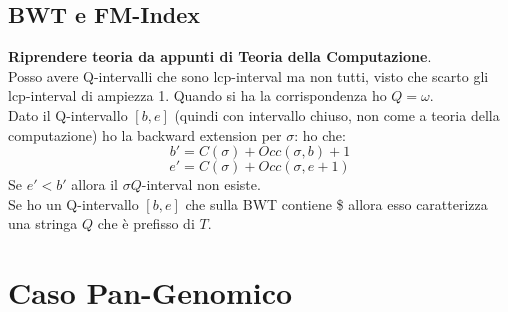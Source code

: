 \documentclass[a4paper,12pt, oneside]{book}
\begin{document}
\subsection{BWT e FM-Index}
\textbf{Riprendere teoria da appunti di Teoria della Computazione}.\\
Posso avere Q-intervalli che sono lcp-interval ma non tutti, visto che scarto
gli lcp-interval di ampiezza 1. Quando si ha la corrispondenza ho $Q=\omega$.\\
Dato il Q-intervallo $[b,e]$ (quindi con intervallo chiuso, non come a teoria
della computazione) ho la backward extension per $\sigma$:
ho che:
\[b'=C(\sigma)+Occ(\sigma,b)+1\]
\[e'=C(\sigma)+Occ(\sigma,e+1)\]
Se $e'<b'$ allora il $\sigma Q$-interval non esiste.\\
Se ho un Q-intervallo $[b,e]$ che sulla BWT contiene \$ allora esso caratterizza
una stringa $Q$ che è prefisso di $T$.
\section{Caso Pan-Genomico}
\
\end{document}
